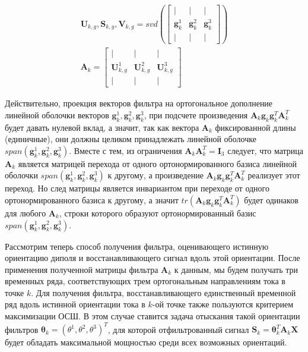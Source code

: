 \begin{gather}
    \mathbf{U}_{k,g}, \mathbf{S}_{k,g}, \mathbf{V}_{k,g} = svd\left(
            \begin{bmatrix}
                |                 & |              & |              \\
                \mathbf{g}_k^1    & \mathbf{g}_k^2 & \mathbf{g}_k^3 \\
                |                 & |              & |
            \end{bmatrix}
     \right)\\
    \mathbf{A}_k = 
            \begin{bmatrix}
                |                 & |              & |              \\
                \mathbf{U}_{k, g}^1    & \mathbf{U}_{k,g}^2 & \mathbf{U}_{k,g}^3 \\
                |                 & |              & |
            \end{bmatrix}
\end{gather}

Действительно, проекция векторов фильтра
на ортогональное дополнение линейной оболочки векторов
$\mathbf{g}_k^1, \mathbf{g}_k^2, \mathbf{g}_k^3$,
при подсчете произведения $\mathbf{A}_k \mathbf{g}_k \mathbf{g}_k^T \mathbf{A}_k^T$
будет давать нулевой вклад, а значит, так как вектора $\mathbf{A}_k$
фиксированной длины (единичные), они должны целиком принадлежать
линейной оболочке $span(\mathbf{g}_k^1, \mathbf{g}_k^2, \mathbf{g}_k^3)$.
Вместе с тем, из ограничения $\mathbf{A}_k \mathbf{A}_k^T = \mathbf{I}_3$ следует, что
матрица $\mathbf{A}_k$ является матрицей перехода от одного ортонормированного базиса
линейной оболочки $span(\mathbf{g}_k^1, \mathbf{g}_k^2, \mathbf{g}_k^3)$ к другому,
а произведение $\mathbf{A}_k \mathbf{g}_k \mathbf{g}_k^T \mathbf{A}_k^T$
реализует этот переход.
Но след матрицы является инвариантом при переходе от одного ортонормированного базиса к другому,
а значит $tr(\mathbf{A}_k \mathbf{g}_k \mathbf{g}_k^T \mathbf{A}_k^T)$
будет одинаков для любого $\mathbf{A}_k$, строки которого образуют ортонормированный базис
$span(\mathbf{g}_k^1, \mathbf{g}_k^2, \mathbf{g}_k^3)$.

Рассмотрим теперь способ получения фильтра, оценивающего истинную ориентацию диполя
и восстанавливающего сигнал вдоль этой ориентации.
После применения полученной матрицы фильтра $\mathbf{A}_k$ к данным,
мы будем получать три временных ряда, соответствующих трем ортогональным направлениям
тока в точке $k$. Для получения фильтра, восстанавливающего единственный временной ряд
вдоль истинной ориентации тока в $k$-ой точке также пользуются критерием максимизации ОСШ.
В этом случае ставится задача отыскания такой ориентации фильтров
$\boldsymbol{\theta}_k = {(\theta^1, \theta^2, \theta^3)}^T$, для
которой отфильтрованный сигнал $\mathbf{S}_k = \boldsymbol{\theta}_k^T \mathbf{A}_k \mathbf{X}$
будет обладать максимальной мощностью среди всех возможных ориентаций.

